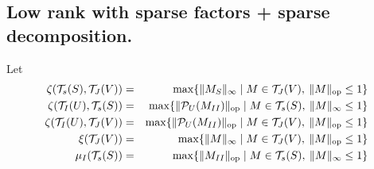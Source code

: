 \documentclass{article}
\def\T{\mathcal{T}}
\def\op{{\rm op}}
\def\xxi{\zeta}
\begin{document}
\subsection*{Low rank with sparse factors + sparse decomposition.}
Let 
\begin{eqnarray*}
\xxi(\T_s(S),\T_J(V))&=&\max \{ {\|M_S\|_\infty} \mid M \in \T_J(V), \: \|M\|_{\op}\leq 1\}\\
\xxi(\T_I(U),\T_s(S))&=&\max \{ {\|\mathcal{P}_{U}(M_{II})\|_{\op}} \mid M \in \T_s(S), \: \|M\|_{\infty}\leq 1\}\\
\xxi(\T_I(U),\T_J(V))&=&\max \{ {\|\mathcal{P}_{U}(M_{II})\|_{\op}} \mid  M \in \T_J(V), \: \|M\|_{\op}\leq 1\}\\
\xi(\T_J(V))&=&\max \{ {\|M\|_\infty} \mid M \in \T_J(V), \: \|M\|_{\op}\leq 1\}\\
\mu_I(\T_s(S))&=&\max \{ {\|M_{II}\|_\op} \mid M \in \T_s(S), \: \|M\|_{\infty}\leq 1\}\\
\end{eqnarray*}
\end{document}
